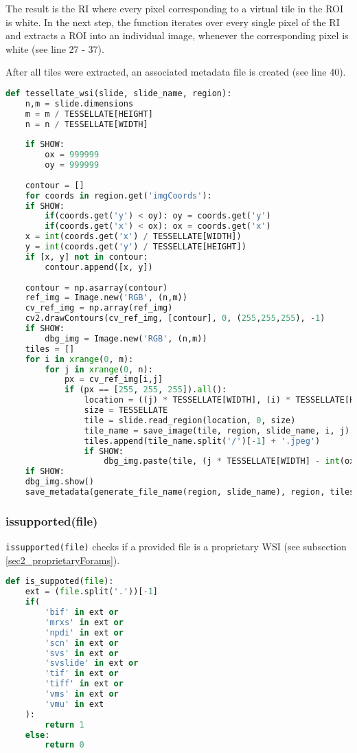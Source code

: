 The result is the RI where every pixel corresponding to a virtual tile in the ROI is white. In the next step, the function iterates over every single pixel of the RI and extracts a ROI into an individual image, whenever the corresponding pixel is white (see line 27 - 37).

After all tiles were extracted, an associated metadata file is created (see line 40).

\begin{lstlisting}[frame=single,language=python]
def tessellate_wsi(slide, slide_name, region):
	n,m = slide.dimensions
	m = m / TESSELLATE[HEIGHT]
	n = n / TESSELLATE[WIDTH]
	
	if SHOW:
		ox = 999999
		oy = 999999
	
	contour = []
	for coords in region.get('imgCoords'):
	if SHOW:
		if(coords.get('y') < oy): oy = coords.get('y')
		if(coords.get('x') < ox): ox = coords.get('x')
	x = int(coords.get('x') / TESSELLATE[WIDTH])
	y = int(coords.get('y') / TESSELLATE[HEIGHT])
	if [x, y] not in contour:
		contour.append([x, y])
	
	contour = np.asarray(contour)
	ref_img = Image.new('RGB', (n,m))
	cv_ref_img = np.array(ref_img)
	cv2.drawContours(cv_ref_img, [contour], 0, (255,255,255), -1)
	if SHOW:
		dbg_img = Image.new('RGB', (n,m))
	tiles = []
	for i in xrange(0, m):
		for j in xrange(0, n):
			px = cv_ref_img[i,j]
			if (px == [255, 255, 255]).all():
				location = ((j) * TESSELLATE[WIDTH], (i) * TESSELLATE[HEIGHT])
				size = TESSELLATE
				tile = slide.read_region(location, 0, size)
				tile_name = save_image(tile, region, slide_name, i, j)
				tiles.append(tile_name.split('/')[-1] + '.jpeg')
				if SHOW:
					dbg_img.paste(tile, (j * TESSELLATE[WIDTH] - int(ox), i * TESSELLATE[HEIGHT] - int(oy)))
	if SHOW:
	dbg_img.show()
	save_metadata(generate_file_name(region, slide_name), region, tiles)
\end{lstlisting}


\subsubsection{is{\textunderscore}supported(file)}
\texttt{is{\textunderscore}supported(file)} checks if a provided file is a proprietary WSI (see subsection \ref{sec2_proprietaryForams}).
\begin{lstlisting}[frame=single,language=python]
def is_suppoted(file):
	ext = (file.split('.'))[-1]
	if(
		'bif' in ext or
		'mrxs' in ext or
		'npdi' in ext or
		'scn' in ext or
		'svs' in ext or
		'svslide' in ext or
		'tif' in ext or
		'tiff' in ext or
		'vms' in ext or
		'vmu' in ext
	):
		return 1
	else:
		return 0
\end{lstlisting}



